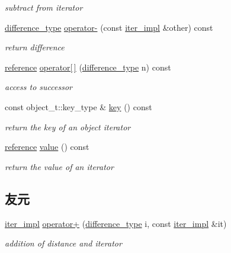 \begin{DoxyCompactItemize}
\begin{DoxyCompactList}\small\item\em subtract from iterator \end{DoxyCompactList}\item 
\mbox{\hyperlink{classnlohmann_1_1detail_1_1iter__impl_a2f7ea9f7022850809c60fc3263775840}{difference\+\_\+type}} \mbox{\hyperlink{classnlohmann_1_1detail_1_1iter__impl_a49bf3e708a9c1c88c415011735962d06}{operator-\/}} (const \mbox{\hyperlink{classnlohmann_1_1detail_1_1iter__impl}{iter\+\_\+impl}} \&other) const
\begin{DoxyCompactList}\small\item\em return difference \end{DoxyCompactList}\item 
\mbox{\hyperlink{classnlohmann_1_1detail_1_1iter__impl_a5be8001be099c6b82310f4d387b953ce}{reference}} \mbox{\hyperlink{classnlohmann_1_1detail_1_1iter__impl_ac0b9276f1102ed4b9cd3f5f56287e3ce}{operator\mbox{[}$\,$\mbox{]}}} (\mbox{\hyperlink{classnlohmann_1_1detail_1_1iter__impl_a2f7ea9f7022850809c60fc3263775840}{difference\+\_\+type}} n) const
\begin{DoxyCompactList}\small\item\em access to successor \end{DoxyCompactList}\item 
const object\+\_\+t\+::key\+\_\+type \& \mbox{\hyperlink{classnlohmann_1_1detail_1_1iter__impl_a15dfb2744fed2ef40c12a9e9a20d6dbc}{key}} () const
\begin{DoxyCompactList}\small\item\em return the key of an object iterator \end{DoxyCompactList}\item 
\mbox{\hyperlink{classnlohmann_1_1detail_1_1iter__impl_a5be8001be099c6b82310f4d387b953ce}{reference}} \mbox{\hyperlink{classnlohmann_1_1detail_1_1iter__impl_ab447c50354c6611fa2ae0100ac17845c}{value}} () const
\begin{DoxyCompactList}\small\item\em return the value of an iterator \end{DoxyCompactList}\end{DoxyCompactItemize}
\subsection*{友元}
\begin{DoxyCompactItemize}
\item 
\mbox{\hyperlink{classnlohmann_1_1detail_1_1iter__impl}{iter\+\_\+impl}} \mbox{\hyperlink{classnlohmann_1_1detail_1_1iter__impl_a94108d1a7563e103534f23eb5c1ee175}{operator+}} (\mbox{\hyperlink{classnlohmann_1_1detail_1_1iter__impl_a2f7ea9f7022850809c60fc3263775840}{difference\+\_\+type}} i, const \mbox{\hyperlink{classnlohmann_1_1detail_1_1iter__impl}{iter\+\_\+impl}} \&it)
\begin{DoxyCompactList}\small\item\em addition of distance and iterator \end{DoxyCompactList}\end{DoxyCompactItemize}


